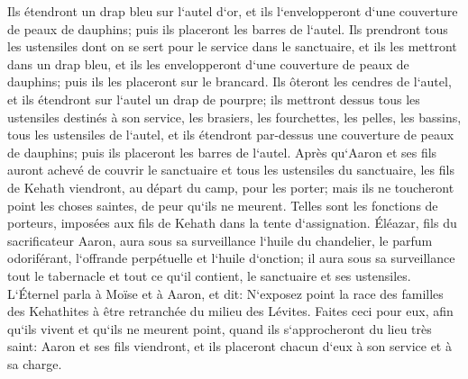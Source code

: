 \verse Ils étendront un drap bleu sur l`autel d`or, et ils l`envelopperont d`une couverture de peaux de dauphins; puis ils placeront les barres de l`autel. 
\verse Ils prendront tous les ustensiles dont on se sert pour le service dans le sanctuaire, et ils les mettront dans un drap bleu, et ils les envelopperont d`une couverture de peaux de dauphins; puis ils les placeront sur le brancard. 
\verse Ils ôteront les cendres de l`autel, et ils étendront sur l`autel un drap de pourpre; 
\verse ils mettront dessus tous les ustensiles destinés à son service, les brasiers, les fourchettes, les pelles, les bassins, tous les ustensiles de l`autel, et ils étendront par-dessus une couverture de peaux de dauphins; puis ils placeront les barres de l`autel. 
\verse Après qu`Aaron et ses fils auront achevé de couvrir le sanctuaire et tous les ustensiles du sanctuaire, les fils de Kehath viendront, au départ du camp, pour les porter; mais ils ne toucheront point les choses saintes, de peur qu`ils ne meurent. Telles sont les fonctions de porteurs, imposées aux fils de Kehath dans la tente d`assignation. 
\verse Éléazar, fils du sacrificateur Aaron, aura sous sa surveillance l`huile du chandelier, le parfum odoriférant, l`offrande perpétuelle et l`huile d`onction; il aura sous sa surveillance tout le tabernacle et tout ce qu`il contient, le sanctuaire et ses ustensiles. 
\verse L`Éternel parla à Moïse et à Aaron, et dit: 
\verse N`exposez point la race des familles des Kehathites à être retranchée du milieu des Lévites. 
\verse Faites ceci pour eux, afin qu`ils vivent et qu`ils ne meurent point, quand ils s`approcheront du lieu très saint: Aaron et ses fils viendront, et ils placeront chacun d`eux à son service et à sa charge. 
